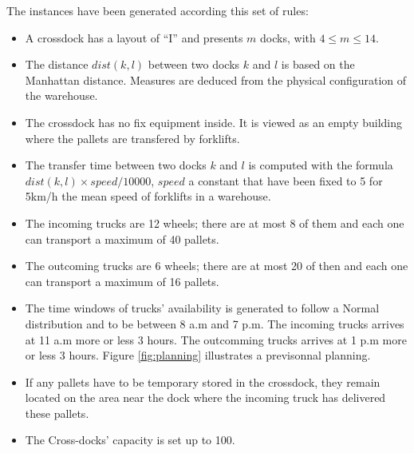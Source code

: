 \documentclass[preprint,12pt,authoryear]{elsarticle}
\begin{document}
The instances have been generated according this set of rules: 
%
\begin{itemize}
    \item A crossdock has a layout of ``I'' and presents $m$ docks, with  $4\le m \le 14$.

    \item The distance $dist(k,l)$ between two docks $k$ and $l$ is based on the Manhattan distance. Measures are deduced from the physical configuration of the warehouse.
    
    \item The crossdock has no fix equipment inside. It is viewed as an empty building where the pallets are transfered by forklifts.
    
        \item The transfer time between two docks $k$ and $l$ is computed with the formula $dist(k,l) \times speed /10000$, $speed$ a constant that have been fixed to 5 for 5km/h the mean speed of forklifts in a warehouse. 
    

 
    
    
    \item The incoming trucks are 12 wheels; there are at most 8 of them and each one can transport a maximum of 40 pallets.
    
    \item The outcoming trucks are 6 wheels; there are at most 20 of then and each one can transport a maximum of 16 pallets.

    \item The time windows of trucks' availability is generated to follow a Normal distribution and to be between 8 a.m and 7 p.m. The incoming trucks arrives at 11 a.m more or less 3 hours. The outcomming trucks arrives at 1 p.m more or less 3 hours. Figure \ref{fig:planning} illustrates a previsonnal planning.
    
    
    

    \item If any pallets have to be temporary stored in the crossdock, they remain located on the area near the dock where the incoming truck has delivered these pallets.

    \item The Cross-docks' capacity is set up to 100.   
    
    
     
    

\end{itemize} 
\end{document}
